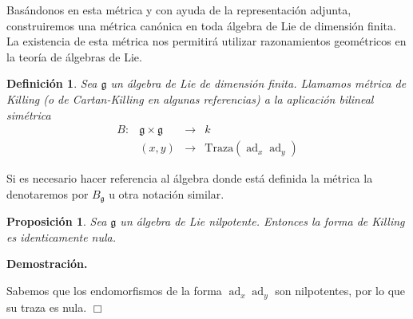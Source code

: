 \documentclass[a4paper,draft,12pt]{scrartcl}
\newtheorem{defi}{Definición}[section]%
\newtheorem{propo}[teo]{Proposición}%
\newcommand{\dem}{\noindent \textbf{Demostración. }\vspace{0.3 cm}}%
\newcommand{\g}{\mathfrak{g}}%
\newcommand{\fin}{ $\Box $ \vspace{0.4 cm}}
\newcommand{\lto}{\longrightarrow}%
\newcommand{\df}[1]{\textsf{\color{blue}#1}}
\DeclareMathOperator{\ad}{ad}  %
\begin{document}
Basándonos en esta métrica y con ayuda de la representación adjunta, construiremos una métrica canónica en toda álgebra de Lie de dimensión finita.  La existencia de esta métrica nos permitirá utilizar razonamientos geométricos en la teoría de álgebras de Lie.

\begin{defi}

Sea $\g$ un álgebra de Lie de dimensión finita.  Llamamos  \df{métri\-ca de Killing}  (o de Cartan-Killing en algunas referencias) a la aplicación bilineal simétrica
$$
\begin{array}{rccc}
B: & \g \times \g & \lto & k \\
   &  (x,y) & \lto & \mathrm{Traza}(\ad_x\ad_y)
\end{array}
$$

\end{defi}

Si es necesario hacer referencia al álgebra donde está definida la métrica la denotaremos por $B_\g$ u otra notación similar.

\begin{propo}

Sea $\g$ un álgebra de Lie nilpotente.  Entonces la forma de Killing es identicamente nula.

\end{propo}

\dem

Sabemos que los endomorfismos de la forma $\ad_x\ad_y$ son nilpotentes, por lo que su traza es nula.  \fin

\bigskip

\end{document}
